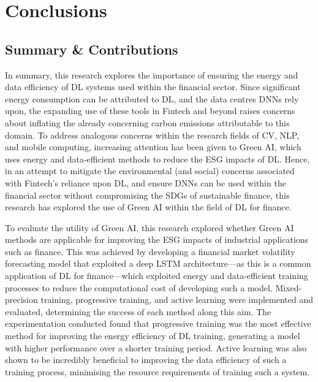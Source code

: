 \documentclass[a4paper, 11pt]{report}
\begin{document}
    \newpage
    \chapter{Conclusions}
    \label{chapter: conclusion}

    \section{Summary \& Contributions}

    In summary, this research explores the importance of ensuring the energy and data efficiency of DL systems used within the financial sector. Since significant energy consumption can be attributed to DL, and the data centres DNNs rely upon, the expanding use of these tools in Fintech and beyond raises concerns about inflating the already concerning carbon emissions attributable to this domain. To address analogous concerns within the research fields of CV, NLP, and mobile computing, increasing attention has been given to Green AI, which uses energy and data-efficient methods to reduce the ESG impacts of DL. Hence, in an attempt to mitigate the environmental (and social) concerns associated with Fintech's reliance upon DL, and ensure DNNs can be used within the financial sector without compromising the SDGs of sustainable finance, this research has explored the use of Green AI within the field of DL for finance.

    To evaluate the utility of Green AI, this research explored whether Green AI methods are applicable for improving the ESG impacts of industrial applications such as finance. This was achieved by developing a financial market volatility forecasting model that exploited a deep LSTM architecture---as this is a common application of DL for finance---which exploited energy and data-efficient training processes to reduce the computational cost of developing such a model. Mixed-precision training, progressive training, and active learning were implemented and evaluated, determining the success of each method along this aim. The experimentation conducted found that progressive training was the most effective method for improving the energy efficiency of DL training, generating a model with higher performance over a shorter training period. Active learning was also shown to be incredibly beneficial to improving the data efficiency of such a training process, minimising the resource requirements of training such a system.
\end{document}

